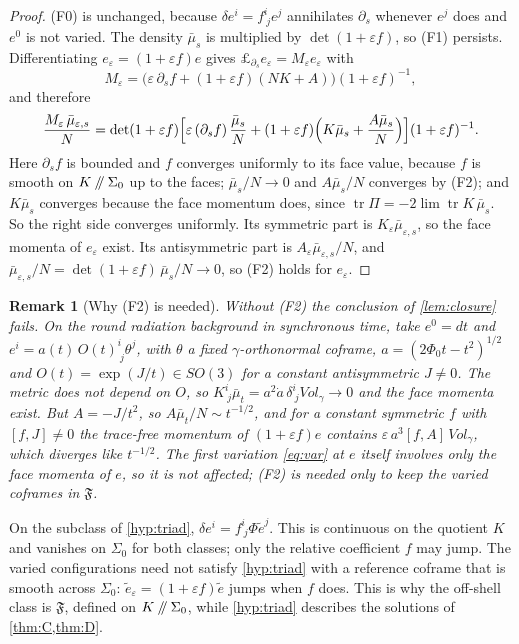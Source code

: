 \documentclass[11pt]{article}
\theoremstyle{canonmath}
\newtheorem{remark}[theorem]{Remark}
\theoremstyle{canonpostulate}
\theoremstyle{canonproposition}
\theoremstyle{canonmath}
\theoremstyle{canonproposition}
\providecommand{\cutK}{\Klein\mathbin{/\mkern-5mu/}\Sigma_0}
\providecommand{\Fcl}{\mathfrak{F}}
\providecommand{\Klein}{\mathcal{K}}
\def\mathrm#1{#1}%
\def\mathcal#1{#1}%
\begin{document}
\begin{proof}
(F0) is unchanged, because $\delta e^i = f^i_{\ j}e^j$ annihilates $\partial_s$ whenever $e^j$ does and $e^0$ is not varied. The density $\bar\mu_s$ is multiplied by $\det(1+\varepsilon f)$, so (F1) persists. Differentiating $e_\varepsilon = (1+\varepsilon f)e$ gives $\pounds_{\partial_s}e_\varepsilon = M_\varepsilon e_\varepsilon$ with
\[
M_\varepsilon = \bigl(\varepsilon\,\partial_sf + (1+\varepsilon f)(NK + A)\bigr)(1+\varepsilon f)^{-1},
\]
and therefore
\[
\frac{M_\varepsilon\,\bar\mu_{\varepsilon,s}}{N} = \det(1+\varepsilon f)\Bigl[\varepsilon\,(\partial_sf)\,\frac{\bar\mu_s}{N} + (1+\varepsilon f)\Bigl(K\bar\mu_s + \frac{A\bar\mu_s}{N}\Bigr)\Bigr](1+\varepsilon f)^{-1}.
\]
Here $\partial_sf$ is bounded and $f$ converges uniformly to its face value, because $f$ is smooth on $\cutK$ up to the faces; $\bar\mu_s/N\to0$ and $A\bar\mu_s/N$ converges by (F2); and $K\bar\mu_s$ converges because the face momentum does, since $\operatorname{tr}\Pi = -2\lim\operatorname{tr}K\,\bar\mu_s$. So the right side converges uniformly. Its symmetric part is $K_\varepsilon\bar\mu_{\varepsilon,s}$, so the face momenta of $e_\varepsilon$ exist. Its antisymmetric part is $A_\varepsilon\bar\mu_{\varepsilon,s}/N$, and $\bar\mu_{\varepsilon,s}/N = \det(1+\varepsilon f)\,\bar\mu_s/N\to0$, so (F2) holds for $e_\varepsilon$.
\end{proof}

\begin{remark}[Why (F2) is needed]\label{rem:F2}
Without (F2) the conclusion of \cref{lem:closure} fails. On the round radiation background in synchronous time, take $e^0 = dt$ and $e^i = a(t)\,O(t)^i_{\ j}\theta^j$, with $\theta$ a fixed $\gamma$-orthonormal coframe, $a = (2\Phi_0t-t^2)^{1/2}$ and $O(t) = \exp(J/t)\in SO(3)$ for a constant antisymmetric $J\neq0$. The metric does not depend on $O$, so $K^i_{\ j}\bar\mu_t = a^2\dot a\,\delta^i_{\ j}\mathrm{Vol}_\gamma\to0$ and the face momenta exist. But $A = -J/t^2$, so $A\bar\mu_t/N\sim t^{-1/2}$, and for a constant symmetric $f$ with $[f,J]\neq0$ the trace-free momentum of $(1+\varepsilon f)e$ contains $\varepsilon\,a^3[f,A]\,\mathrm{Vol}_\gamma$, which diverges like $t^{-1/2}$. The first variation \eqref{eq:var} at $e$ itself involves only the face momenta of $e$, so it is not affected; (F2) is needed only to keep the varied coframes in $\Fcl$.
\end{remark}

On the subclass of \ref{hyp:triad}, $\delta e^i = f^i_{\ j}\Phi\tilde e^j$. This is continuous on the quotient $\Klein$ and vanishes on $\Sigma_0$ for both classes; only the relative coefficient $f$ may jump. The varied configurations need not satisfy \ref{hyp:triad} with a reference coframe that is smooth across $\Sigma_0$: $\tilde e_\varepsilon = (1+\varepsilon f)\tilde e$ jumps when $f$ does. This is why the off-shell class is $\Fcl$, defined on $\cutK$, while \ref{hyp:triad} describes the solutions of \cref{thm:C,thm:D}.
\end{document}
